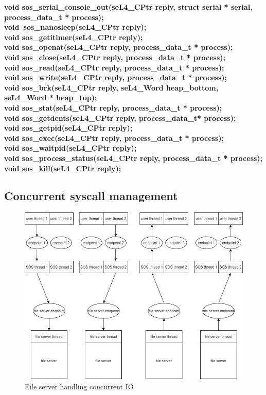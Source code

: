\noindent \textbf{void sos\_serial\_console\_out(seL4\_CPtr reply, struct serial * serial, process\_data\_t * process);} \\
\noindent \textbf{void\ sos\_nanosleep(seL4\_CPtr reply);} \\
\noindent \textbf{void sos\_getitimer(seL4\_CPtr reply);} \\
\noindent \textbf{void sos\_openat(seL4\_CPtr reply, process\_data\_t * process);} \\
\noindent \textbf{void sos\_close(seL4\_CPtr reply, process\_data\_t * process);} \\
\noindent \textbf{void sos\_read(seL4\_CPtr reply, process\_data\_t * process);} \\
\noindent \textbf{void sos\_write(seL4\_CPtr reply, process\_data\_t * process);} \\
\noindent \textbf{void sos\_brk(seL4\_CPtr reply, seL4\_Word heap\_bottom, seL4\_Word * heap\_top);} \\
\noindent \textbf{void sos\_stat(seL4\_CPtr reply, process\_data\_t * process);} \\
\noindent \textbf{void sos\_getdents(seL4\_CPtr reply, process\_data\_t* process);} \\
\noindent \textbf{void sos\_getpid(seL4\_CPtr reply);} \\
\noindent \textbf{void sos\_exec(seL4\_CPtr reply, process\_data\_t * process);} \\
\noindent \textbf{void sos\_waitpid(seL4\_CPtr reply);} \\
\noindent \textbf{void sos\_process\_status(seL4\_CPtr reply, process\_data\_t * process);} \\
\noindent \textbf{void sos\_kill(seL4\_CPtr reply);} \\

\subsection{Concurrent syscall management}

\begin{figure}[h]
    \includegraphics[width=\linewidth]{concurrent_syscalls.png}
    \caption{File server handling concurrent IO}
    \label{fig:concurrent_syscalls}
\end{figure}

